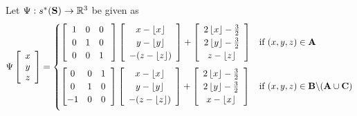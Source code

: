 \documentclass[]{article}
\begin{document}
\begin{Def}
Let $\Psi:s^*(\mathbf{S})\rightarrow\mathbb{R}^3$ be given as
\begin{equation}
\Psi\left[\begin{array}{c}
	x\\y\\z
\end{array}\right] 
= 
\begin{cases}
	\left[ \hspace{2mm} \begin{matrix}
		1 & 0 & 0 \\
		0 & 1 & 0 \\
		0 & 0 & 1
	\end{matrix}\hspace{3mm}\right]

	\left[\begin{array}{c}
	x - \left\lfloor x \right\rfloor
	\\ y- \left\lfloor y \right\rfloor
	\\ -(z - \left\lfloor z \right\rfloor)
	\end{array} \right]
	+
	\left[\begin{array}{c}
		2 \left\lfloor x \right\rfloor - \frac{3}{2}
		\\ 2\left\lfloor y \right\rfloor - \frac{3}{2}
		\\ z - \left\lfloor z \right\rfloor
	\end{array} \right]
		& \text{if } (x,y,z)\in \mathbf{A}	\vspace{2mm}
	\\
		
		
	\left[ \begin{matrix}
	0 & 0 & 1 \\
	0 & 1 & 0 \\
	-1 & 0 & 0
	\end{matrix}\hspace{2mm}\right]
	\left[\begin{array}{c}
		x - \left\lfloor x \right\rfloor
		\\ y- \left\lfloor y \right\rfloor
		\\ -(z - \left\lfloor z \right\rfloor)
		\end{array} \right]
	+
		\left[\begin{array}{c}
			2 \left\lfloor x \right\rfloor - \frac{3}{2}
			\\ 2\left\lfloor y \right\rfloor - \frac{3}{2}
			\\ x - \left\lfloor x \right\rfloor
		\end{array} \right]
			& \text{if } (x,y,z)\in \mathbf{B}\backslash(\mathbf{A}\cup\mathbf{C})	\vspace{2mm}
	\\
	

\end{cases}
\end{equation}
\end{Def}
\end{document}

